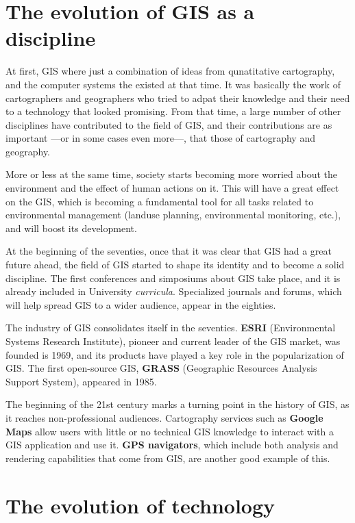 \section{The evolution of GIS as a discipline}

At first, GIS where just a combination of ideas from qunatitative cartography, and the computer systems the existed at that time. It was basically the work of cartographers and geographers who tried to adpat their knowledge and their need to a technology that looked promising. From that time, a large number of other disciplines have contributed to the field of GIS, and their contributions are as important ---or in some cases even more---, that those of cartography and geography.

More or less at the same time, society starts becoming more worried about the environment and the effect of human actions on it. This will have a great effect on the GIS, which is becoming a fundamental tool for all tasks related to environmental management (landuse planning, environmental monitoring, etc.), and will boost its development.

At the beginning of the seventies, once that it was clear that GIS had a great future ahead, the field of GIS started to shape its identity and to become a solid discipline. The first conferences and simposiums about GIS take place, and it is already included in University \emph{curricula}. Specialized journals and forums, which will help spread GIS to a wider audience, appear in the eighties.


The industry of GIS consolidates itself in the seventies. \textbf{ESRI} (Environmental Systems Research Institute), pioneer and current leader of the GIS market, was founded is 1969, and its products have played a key role in the popularization of GIS. The first open-source GIS, \textbf{GRASS} (Geographic Resources Analysis Support System), appeared in 1985.

The beginning of the 21st century marks a turning point in the history of GIS, as it reaches non-professional audiences. Cartography services such as  \textbf{Google Maps} allow users with little or no technical GIS knowledge to interact with a GIS application and use it. \textbf{GPS navigators}, which include both analysis and rendering capabilities that come from GIS, are another good example of this.

\section{The evolution of technology}


